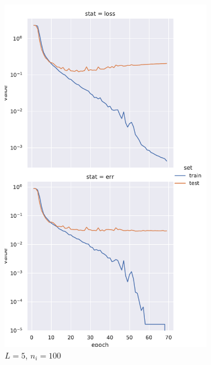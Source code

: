 \documentclass[a4paper]{article}
\begin{document}
\begin{figure}[!ht]
    \centering
    \begin{subfigure}{0.24\textwidth}
    \includegraphics[width=\columnwidth]{mnist/L_5_w_100}
    \caption{$L = 5$, $n_i = 100$}
\end{subfigure}
\begin{subfigure}{0.24\textwidth}

\end{subfigure}
\end{figure}
\end{document}

